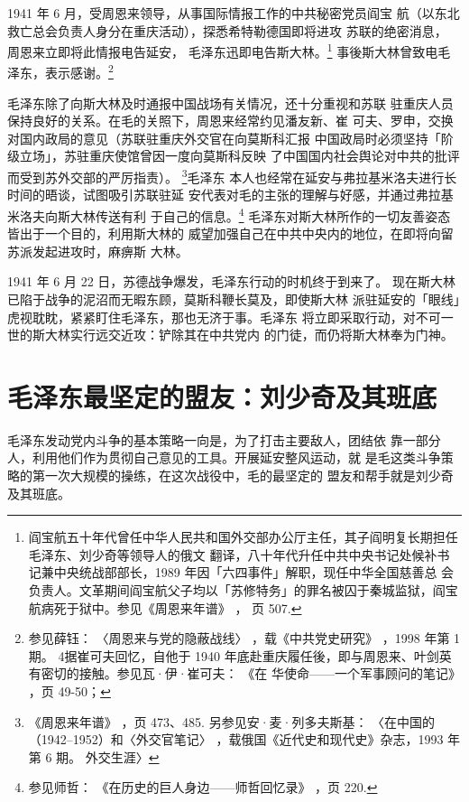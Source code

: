 1941 年 6 月，受周恩来领导，从事国际情报工作的中共秘密党员阎宝
航（以东北救亡总会负责人身分在重庆活动），探悉希特勒德国即将进攻
苏联的绝密消息，
周恩来立即将此情报电告延安，
毛泽东迅即电告斯大林。\footnote{阎宝航五十年代曾任中华人民共和国外交部办公厅主任，其子阎明复长期担任毛泽东、刘少奇等领导人的俄文
翻译，八十年代升任中共中央书记处候补书记兼中央统战部部长，1989 年因「六四事件」解职，现任中华全国慈善总
会负责人。文革期间阎宝航父子均以「苏修特务」的罪名被囚于秦城监狱，阎宝航病死于狱中。参见《周恩来年谱》
，
页 507. 
}
事後斯大林曾致电毛泽东，表示感谢。\footnote{参见薛钰：
〈周恩来与党的隐蔽战线〉
，载《中共党史研究》
，1998 年第 1 期。
4据崔可夫回忆，自他于 1940 年底赴重庆履任後，即与周恩来、叶剑英有密切的接触。参见瓦·伊·崔可夫：
《在
华使命——一个军事顾问的笔记》
，页 49-50；}

毛泽东除了向斯大林及时通报中国战场有关情况，还十分重视和苏联
驻重庆人员保持良好的关系。在毛的关照下，周恩来经常约见潘友新、崔
可夫、罗申，交换对国内政局的意见（苏联驻重庆外交官在向莫斯科汇报
中国政局时必须坚持「阶级立场」，苏驻重庆使馆曾因一度向莫斯科反映
了中国国内社会舆论对中共的批评而受到苏外交部的严厉指责）。
\footnote{《周恩来年谱》
，页 473、485. 另参见安·麦·列多夫斯基：
〈在中国的
（1942--1952）和〈外交官笔记〉
，载俄国《近代史和现代史》杂志，1993 年第 6 期。
外交生涯〉
}毛泽东
本人也经常在延安与弗拉基米洛夫进行长时间的晤谈，试图吸引苏联驻延
安代表对毛的主张的理解与好感，并通过弗拉基米洛夫向斯大林传送有利
于自己的信息。\footnote{参见师哲：
《在历史的巨人身边——师哲回忆录》
，页 220. 
}
毛泽东对斯大林所作的一切友善姿态皆出于一个目的，利用斯大林的
威望加强自己在中共中央内的地位，在即将向留苏派发起进攻时，麻痹斯
大林。

1941 年 6 月 22 日，苏德战争爆发，毛泽东行动的时机终于到来了。
现在斯大林已陷于战争的泥沼而无暇东顾，莫斯科鞭长莫及，即使斯大林
派驻延安的「眼线」虎视耽眈，紧紧盯住毛泽东，那也无济于事。毛泽东
将立即采取行动，对不可一世的斯大林实行远交近攻：铲除其在中共党内
的门徒，而仍将斯大林奉为门神。

\section{毛泽东最坚定的盟友：刘少奇及其班底
}
毛泽东发动党内斗争的基本策略一向是，为了打击主要敌人，团结依
靠一部分人，利用他们作为贯彻自己意见的工具。开展延安整风运动，就
是毛这类斗争策略的第一次大规模的操练，在这次战役中，毛的最坚定的
盟友和帮手就是刘少奇及其班底。

